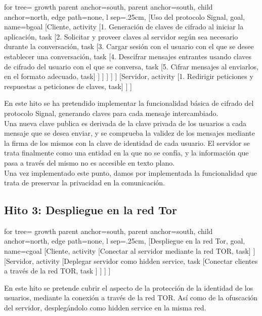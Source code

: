 \begin{adjustbox}{margin=2.5ex 5ex 2.5ex 2.5ex,center}
	\begin{forest} for tree={
			growth parent anchor=south,
			parent anchor=south,
			child anchor=north,
			edge path={none}, 
			l sep=.25cm,
	}   
	[Uso del protocolo Signal, goal, name=bgoal
		[Cliente, activity
		[1. Generación de claves de cifrado al iniciar la aplicación, task
		[2. Solicitar y proveer claves al servidor según sea necesario durante la conversación, task
		[3. Cargar sesión con el usuario con el que se desee establecer una conversación, task
		[4. Descifrar mensajes entrantes usando claves de cifrado del usuario con el que se conversa, task
		[5. Cifrar mensajes al enviarlos{,} en el formato adecuado, task] ] ] ] ] ]
		[Servidor, activity
		[1. Redirigir peticiones y respuestas a peticiones de claves, task] ] ] 
	\end{forest}
\end{adjustbox}

En este hito se ha pretendido implementar la funcionalidad básica de cifrado del protocolo Signal, generando claves para cada mensaje intercambiado. \\

Una nueva clave publica es derivada de la clave privada de los usuarios a cada mensaje que se desea enviar, y se comprueba la validez de los mensajes mediante la firma de los mismos con la clave de identidad de cada usuario.
El servidor se trata finalmente como una entidad en la que no se confía, y la información que pasa a través del mismo no es accesible en texto plano. \\

Una vez implementado este punto, damos por implementada la funcionalidad que trata de preservar la privacidad en la comunicación. \\ 

\subsection{Hito 3: Despliegue en la red Tor}
\begin{adjustbox}{margin=2.5ex 5ex 2.5ex 2.5ex,center}
	\begin{forest} for tree={
			growth parent anchor=south,
			parent anchor=south,
			child anchor=north,
			edge path={none}, 
			l sep=.25cm,
	}   
	[Despliegue en la red Tor, goal, name=cgoal
		[Cliente, activity
		[Conectar al servidor mediante la red TOR, task] ]
		[Servidor, activity
		[Deplegar servidor como hidden service, task
		[Conectar clientes a través de la red TOR, task ] ] ] ] 
	\end{forest}
\end{adjustbox}

En este hito se pretende cubrir el aspecto de la protección de la identidad de los usuarios, mediante la conexión a través de la red TOR. Así como de la ofuscación del servidor, desplegándolo como hidden service en la misma red. \\